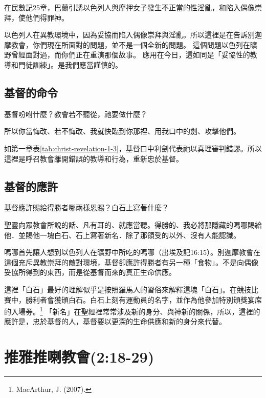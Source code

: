 在民數記25章，巴蘭引誘以色列人與摩押女子發生不正當的性淫亂，和陷入偶像崇拜，使他們得罪神。

以色列人在異教環境中，因為妥協而陷入偶像崇拜與淫亂。所以這裡是在告訴別迦摩教會，你們現在所面對的問題，並不是一個全新的問題。
這個問題以色列在曠野曾經面對過，而你們正在重演那個故事。
應用在今日，這如同是「妥協性的教導和門徒訓練」。是我們應當謹慎的。

\subsection{基督的命令}

\begin{ScriptureBox2}{基督吩咐什麼？教會若不聽從，祂要做什麼？}

\item[2:16] 所以你當悔改、若不悔改、我就快臨到你那裡、用我口中的劍、攻擊他們。

\end{ScriptureBox2}
如第一章表\ref{tab:christ-revelation-1-3}，基督口中利劍代表祂以真理審判錯謬。所以這裡是呼召教會離開錯誤的教導和行為，重新忠於基督。

\subsection{基督的應許}

\begin{ScriptureBox2}{基督應許賜給得勝者哪兩樣恩賜？白石上寫著什麼？}

\item[2:17] 聖靈向眾教會所說的話、凡有耳的、就應當聽。得勝的、我必將那隱藏的嗎哪賜給他．並賜他一塊白石、石上寫著新名．除了那領受的以外、沒有人能認識。

\end{ScriptureBox2}

嗎哪首先讓人想到以色列人在曠野中所吃的嗎哪（出埃及記16:15）。別迦摩教會在這個充斥異教崇拜的敵對環境，基督卻應許得勝者有另一種「食物」。不是向偶像妥協所得到的東西，而是從基督而來的真正生命供應。

這裡「白石」最好的理解似乎是按照羅馬人的習俗來解釋這塊「白石」。在競技比賽中，勝利者會獲頒白石。白石上刻有運動員的名字，並作為他參加特別頒獎宴席的入場券。\footnote{MacArthur, J. (2007). }
「新名」在聖經裡常常涉及新的身分、與神新的關係，所以，這裡的應許是，忠於基督的人，基督要以更深的生命供應和新的身分來代替。

\section{推雅推喇教會(2:18-29)}

